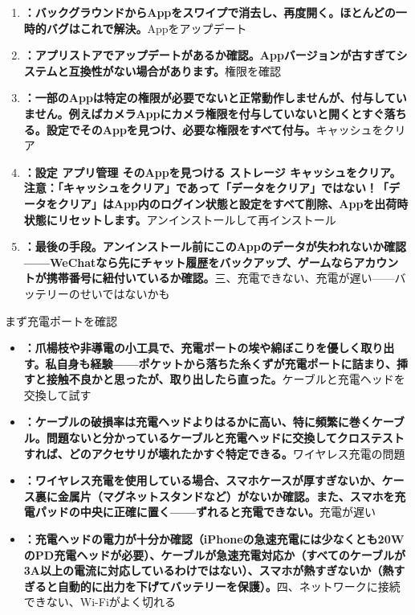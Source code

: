 \begin{enumerate}
  \item \textbf{：バックグラウンドからAppをスワイプで消去し、再度開く。ほとんどの一時的バグはこれで解決。}Appをアップデート
  \item \textbf{：アプリストアでアップデートがあるか確認。Appバージョンが古すぎてシステムと互換性がない場合があります。}権限を確認
  \item \textbf{：一部のAppは特定の権限が必要でないと正常動作しませんが、付与していません。例えばカメラAppにカメラ権限を付与していないと開くとすぐ落ちる。設定でそのAppを見つけ、必要な権限をすべて付与。}キャッシュをクリア
  \item \textbf{：設定 アプリ管理 そのAppを見つける ストレージ キャッシュをクリア。注意：「キャッシュをクリア」であって「データをクリア」ではない！「データをクリア」はApp内のログイン状態と設定をすべて削除、Appを出荷時状態にリセットします。}アンインストールして再インストール
  \item \textbf{：最後の手段。アンインストール前にこのAppのデータが失われないか確認——WeChatなら先にチャット履歴をバックアップ、ゲームならアカウントが携帯番号に紐付いているか確認。}三、充電できない、充電が遅い——バッテリーのせいではないかも
\end{enumerate}


まず充電ポートを確認

\begin{itemize}
  \item \textbf{：爪楊枝や非導電の小工具で、充電ポートの埃や綿ぼこりを優しく取り出す。私自身も経験——ポケットから落ちた糸くずが充電ポートに詰まり、挿すと接触不良かと思ったが、取り出したら直った。}ケーブルと充電ヘッドを交換して試す
  \item \textbf{：ケーブルの破損率は充電ヘッドよりはるかに高い、特に頻繁に巻くケーブル。問題ないと分かっているケーブルと充電ヘッドに交換してクロステストすれば、どのアクセサリが壊れたかすぐ特定できる。}ワイヤレス充電の問題
  \item \textbf{：ワイヤレス充電を使用している場合、スマホケースが厚すぎないか、ケース裏に金属片（マグネットスタンドなど）がないか確認。また、スマホを充電パッドの中央に正確に置く——ずれると充電できない。}充電が遅い
  \item \textbf{：充電ヘッドの電力が十分か確認（iPhoneの急速充電には少なくとも20WのPD充電ヘッドが必要）、ケーブルが急速充電対応か（すべてのケーブルが3A以上の電流に対応しているわけではない）、スマホが熱すぎないか（熱すぎると自動的に出力を下げてバッテリーを保護）。}四、ネットワークに接続できない、Wi-Fiがよく切れる
\end{itemize}

